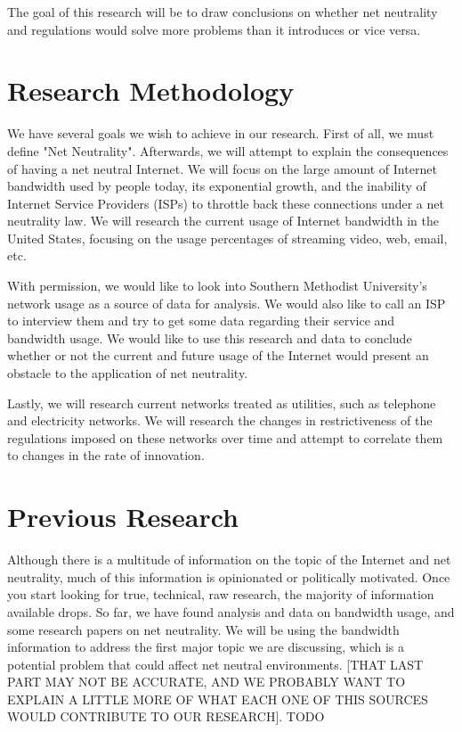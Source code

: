 \documentclass{sigcomm-alternate}
\begin{document}
The goal of this research will be to draw conclusions on whether net neutrality and regulations would solve more problems than it introduces or vice versa.



     		
\section{Research Methodology}
We have several goals we wish to achieve in our research. First of all, we must define "Net Neutrality". Afterwards, we will attempt to explain the consequences of having a net neutral Internet. We will focus on the large amount of Internet bandwidth used by people today, its exponential growth, and the inability of Internet Service Providers (ISPs) to throttle back these connections under a net neutrality law. We will research the current usage of Internet bandwidth in the United States, focusing on the usage percentages of streaming video, web, email, etc. 

With permission, we would like to look into Southern Methodist University's network usage as a source of data for analysis. We would also like to call an ISP to interview them and try to get some data regarding their service and bandwidth usage. We would like to use this research and data to conclude whether or not the current and future usage of the Internet would present an obstacle to the application of net neutrality.  

Lastly, we will research current networks treated as utilities, such as telephone and electricity networks. We will research the changes in restrictiveness of the regulations imposed on these networks over time and attempt to correlate them to changes in the rate of innovation.


\section{Previous Research}
Although there is a multitude of information on the topic of the Internet and net neutrality, much of this information is opinionated or politically motivated. Once you start looking for true, technical, raw research, the majority of information available drops. So far, we have found analysis and data on bandwidth usage, and some research papers on net neutrality. We will be using the bandwidth information to address the first major topic we are discussing, which is a potential problem that could affect net neutral environments. [THAT LAST PART MAY NOT BE ACCURATE, AND WE PROBABLY WANT TO EXPLAIN A LITTLE MORE OF WHAT EACH ONE OF THIS SOURCES WOULD CONTRIBUTE TO OUR RESEARCH].
TODO
\cite{Jain:2002:EAB:633025.633054}
\cite{Strauss:2003:MSA:948205.948211}
\end{document}
